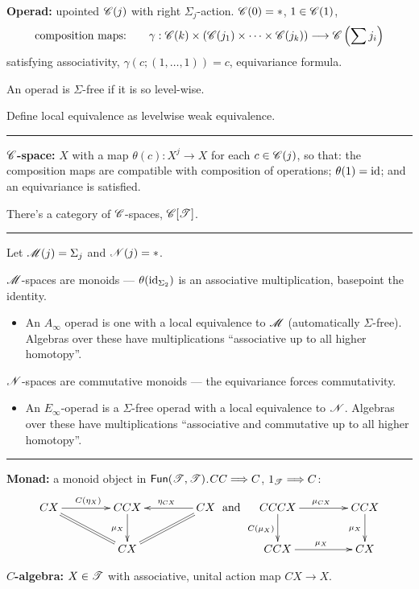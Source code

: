 \documentclass[11pt]{article}
\begin{document}
\begin{Operads}
\begin{itemise}
\item \textbf{Operad:} upointed $\mathscr{C}(j)$ with right $\Sigma_j$-action. $\mathscr{C}(0)=*$, $1\in\mathscr{C}(1)$, 
\[\textup{composition maps:\qquad }\gamma:\mathscr{C}(k)\times\left(\mathscr{C}(j_1)\times\cdots\times\mathscr{C}(j_k)\right)
\longrightarrow\mathscr{C}\left(\sum j_i\right)\]
satisfying associativity, $\gamma(c;(1,\ldots,1))=c$, equivariance formula.
\item An operad is $\Sigma$-free if it is so level-wise.
\item Define local equivalence as levelwise weak equivalence.
\hrule
\item \textbf{$\mathscr{C}$-space:} $X$ with a map $\theta(c):X^j\to X$ for each $c\in \mathscr{C}(j)$, so that: the composition maps are compatible with composition of operations; $\theta(1)=\textup{id}$; and an equivariance is satisfied.
\item There's a category of $\mathscr{C}$-spaces, $\mathscr{C}[\mathscr{T}]$.
\hrule
\item Let $\mathscr{M}(j)=\Sigma_j$ and $\mathscr{N}(j)=*$. 
\item $\mathscr{M}$-spaces are monoids --- $\theta(\textup{id}_{\Sigma_2})$ is an associative multiplication, basepoint the identity.
\begin{itemize}\squishlist
\item An $A_\infty$ operad is one with a local equivalence to $\mathscr{M}$ (automatically $\Sigma$-free). Algebras over these have multiplications ``associative up to all higher homotopy''.
\end{itemize}
\item $\mathscr{N}$-spaces are commutative monoids --- the equivariance forces commutativity. 
\begin{itemize}\squishlist
\item An $E_\infty$-operad is a $\Sigma$-free operad with a local equivalence to $\mathscr{N}$. Algebras over these have multiplications ``associative and commutative up to all higher homotopy''.
\end{itemize}
\hrule
\item \textbf{Monad:} a monoid object in $\operatorname{{\mathsf{Fun}}}(\mathscr{T},\mathscr{T})$.\qquad  $CC\Longrightarrow C$, $1_{\mathscr{T}}\Longrightarrow C$:
\[\xymatrix@C=1.5cm{
CX\ar[r]^{C(\eta_X)}&CCX\ar[d]_{\mu_X}&CX\ar[l]_{\eta_{CX}}\\
&CX\ar@{=}[lu]\ar@{=}[ru]
}
\text{ and }
\xymatrix@C=1.5cm{
CCCX\ar[r]^{\mu_{CX}}\ar[d]_{C(\mu_X)}&CCX\ar[d]_{\mu_X}\\
CCX\ar[r]^{\mu_X}&CX
}
\]
\item \textbf{$C$-algebra:} $X\in\mathscr{T}$ with associative, unital action map $CX\to X$.

\end{itemise}
\end{Operads}
\end{document}

